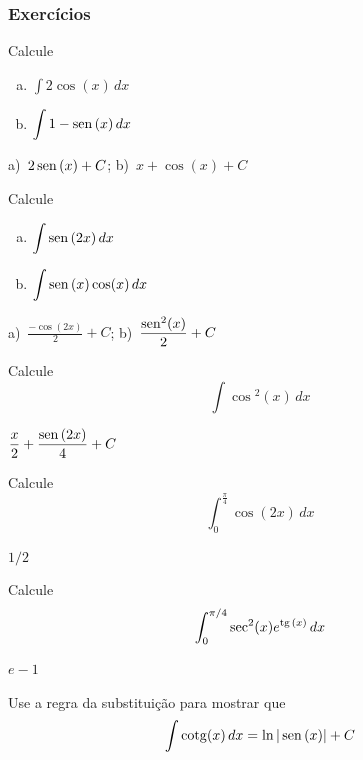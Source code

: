 \cleardoublepage\documentclass[../main.tex]{subfiles}
\begin{document}
\subsubsection{Exercícios}
\begin{exer}
  Calcule
   \begin{multicols}{2}
  \begin{enumerate}[a)]
  \item $\displaystyle\int 2\cos(x)\,dx$
  \item $\displaystyle\int  1 - \operatorname{sen}\,(x)\,dx$
    \end{enumerate}\end{multicols}
\end{exer}
\begin{resp}
  a)~$\displaystyle 2\operatorname{sen}\,(x) + C$; b)~$\displaystyle x + \cos(x) + C$
\end{resp}
\begin{exer}
  Calcule
  \begin{multicols}{3}
  \begin{enumerate}[a)]
  \item $\displaystyle \int \operatorname{sen}\,(2x)\,dx$
    \item $\displaystyle \int \operatorname{sen}\,(x)\cos(x)\,dx$
  \end{enumerate}\end{multicols}
\end{exer}
\begin{resp}
  a)~$\displaystyle \frac{-\cos(2x)}{2} + C$; b)~$\displaystyle \frac{\operatorname{sen}\,\!\!^2(x)}{2} + C$
\end{resp}

\begin{exer}
  Calcule
  \begin{equation*}
    \int \cos\!\!^2(x)\,dx
  \end{equation*}
\end{exer}
\begin{resp}
  $\displaystyle \frac{x}{2} + \frac{\operatorname{sen}\,(2x)}{4} + C$
\end{resp}

\begin{exer}
  Calcule
  \begin{equation*}
    \int_0^{\frac{\pi}{4}}\cos(2x)\,dx
  \end{equation*}
\end{exer}
\begin{resp}
  $1/2$
\end{resp}
\begin{exer}
  Calcule
  \begin{equation*}
    \int_0^{\pi/4} \sec^2(x)e^{\operatorname{tg}\,(x)}\,dx
  \end{equation*}
\end{exer}
\begin{resp}
  $e-1$
\end{resp}
\begin{exer}\label{exer:int_subs_cotg}
  Use a regra da substituição para mostrar que
  \begin{equation*}
    \int \operatorname{cotg}(x)\,dx = \ln|\operatorname{sen}\,(x)| + C
  \end{equation*}
\end{exer}
\end{document}
